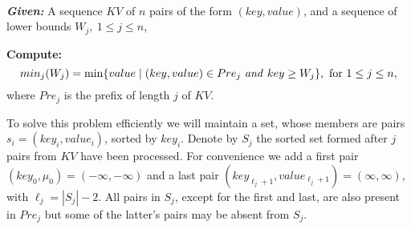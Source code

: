 \begin{problem}\label{p.msp}\ 

\noindent \emph{\bf Given:} A sequence $KV$ of $n$ pairs of the form $(key,value)$,
	and a sequence of lower bounds $W_j,\  1\leq j \leq n$, 


\noindent \textbf{Compute:} 
\begin{equation}
min_j(W_j)=\min \{value \mid (key,value)\in Pre_j \mbox{ \emph{and} } key \geq W_j\},  \mbox{ for }1\leq j \leq n, \label{e.min-m-v}
\end{equation}
where $Pre_j$ is the prefix of length $j$ of $KV$.
\end{problem}

To solve this problem efficiently we will maintain a set, whose members are 
pairs  $s_i=(key_{i}, value_{i})$, sorted by $key_i$.  
Denote by $S_j$ the sorted set formed after $j$ pairs
from $KV$ have been processed.
For convenience we add a first pair $(key_{0},\mu_{0})=(-\infty,-\infty)$
and a last pair
$(key_{\ell_j+1},value_{\ell_j+1})=(\infty,\infty)$, with $\ell_j=|S_j|-2$.
All pairs in $S_j$, except for the first and last, are also present in $Pre_j$ but some of the 
latter's pairs may be absent from $S_j$. 

